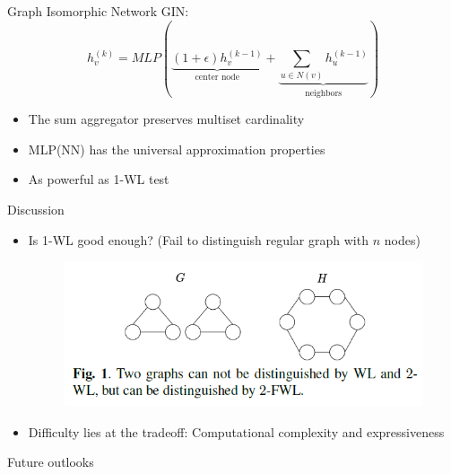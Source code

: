\documentclass[aspectratio=169]{beamer} %
\begin{document}
\begin{frame}{Graph Isomorphic Network}
GIN:
$$
h^{(k)}_v = MLP\left(\underbrace{(1+\epsilon)h^{(k-1)}_v}_{\text{center node}}+\underbrace{\sum_{u\in N(v)} h^{(k-1)}_u}_{\text{neighbors}}\right)
$$
\begin{itemize}
    \item The sum aggregator preserves multiset cardinality
    \item MLP(NN) has the universal approximation properties
    \item As powerful as 1-WL test
\end{itemize}
\end{frame}
\begin{frame}{Discussion}
\begin{itemize}
    \item Is 1-WL good enough? (Fail to distinguish regular graph with $n$ nodes)
    \begin{figure}
        \centering
        \includegraphics[width=0.7\linewidth]{Network/Graph Neural Network/1-WL fail.png}
    \end{figure}
    \item Difficulty lies at the tradeoff: Computational complexity and expressiveness 
\end{itemize}
    
\end{frame}
\begin{frame}{Future outlooks}
\begin{itemize}
\end{itemize}
    
\end{frame}
\end{document}
